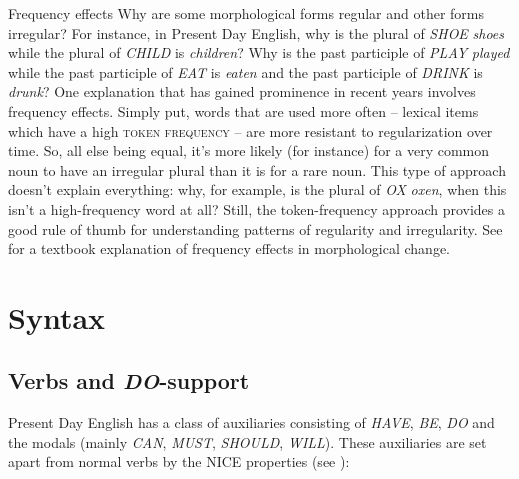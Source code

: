 \begin{miscbox}{Frequency effects}
Why are some morphological forms regular and other forms irregular? For instance, in Present Day English, why is the plural of \textit{SHOE} \textit{shoes} while the plural of \textit{CHILD} is \textit{children}? Why is the past participle of \textit{PLAY} \textit{played} while the past participle of \textit{EAT} is \textit{eaten} and the past participle of \textit{DRINK} is \textit{drunk}? One explanation that has gained prominence in recent years involves frequency effects. Simply put, words that are used more often -- lexical items which have a high \textsc{token frequency} -- are more resistant to regularization over time. So, all else being equal, it's more likely (for instance) for a very common noun to have an irregular plural than it is for a rare noun. This type of approach doesn't explain everything: why, for example, is the plural of \textit{OX} \textit{oxen}, when this isn't a high-frequency word at all? Still, the token-frequency approach provides a good rule of thumb for understanding patterns of regularity and irregularity. See \citet[chapter 5]{Bybee2015} for a textbook explanation of frequency effects in morphological change.
\end{miscbox}


\section{Syntax}
\largerpage
\subsection{Verbs and \emph{DO}-support}\label{EModE-do}
Present Day English has a class of auxiliaries consisting of \emph{HAVE}, \emph{BE}, \emph{DO} and the modals (mainly \emph{CAN}, \emph{MUST}, \emph{SHOULD}, \emph{WILL}). These auxiliaries are set apart from normal verbs by the NICE properties (see \citealp[92--93]{HuddlestonePullum2002}):

